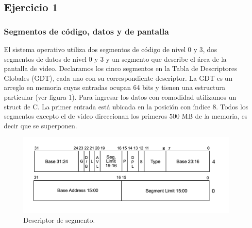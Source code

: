 \subsection{Ejercicio 1}

\subsubsection{Segmentos de código, datos y de pantalla}
El sistema operativo utiliza dos segmentos de código de nivel 0 y 3, dos segmentos de datos de nivel 0 y 3 y un segmento que describe el área de la pantalla de video. Declaramos los cinco segmentos en la Tabla de Descriptores Globales (GDT), cada uno con su correspondiente descriptor. La GDT es un arreglo en memoria cuyas entradas ocupan 64 bits y tienen una estructura particular (ver figura 1). Para ingresar los datos con comodidad utilizamos un struct de C. La primer entrada está ubicada en la posición con índice 8. Todos los segmentos excepto el de video direccionan los primeros 500 MB de la memoria, es decir que se superponen.\newline
\begin{figure}[h]
\centering
\includegraphics[scale=0.6] {descriptor_segmento}
\caption{Descriptor de segmento.}
\end{figure}
